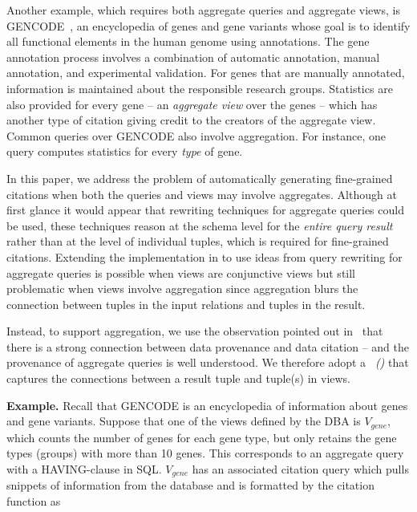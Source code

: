 Another example, which requires both aggregate queries and aggregate views, is GENCODE~\cite{harrow2012gencode}, an encyclopedia of genes and gene variants whose goal is to identify all functional elements in the human genome using annotations. The gene annotation process involves a combination of automatic annotation, manual annotation, and experimental validation. For genes that are manually annotated, information is maintained about the responsible research groups. Statistics are also provided for every gene -- an {\em aggregate view} over the genes -- which has another type of citation giving credit to the creators of the aggregate view.
Common queries over GENCODE also involve aggregation. For instance, one query computes statistics for every \textit{type} of gene.

In this paper, we address the problem of automatically generating fine-grained citations when both the queries and views may involve aggregates.    Although at first glance it would appear that rewriting techniques for aggregate queries \cite{zaharioudakis2000answering, srivastava1996answering, galindo2001orthogonal,cohen2006rewriting,cohen2006user} could be used, these techniques reason at the schema level for the \textit{entire query result} rather than at the level of individual tuples, which is required for fine-grained citations.  
Extending the implementation in \cite{wu2018data} to use ideas from query rewriting for aggregate queries is possible when views are conjunctive views but still problematic when views involve aggregation since aggregation blurs the connection between tuples in the input relations and tuples in the result.  

Instead, to support aggregation, we use the observation pointed out in~\cite{BunemanEtAl2016,alawini2018data} that there is a strong connection between data provenance and data citation -- and the provenance of aggregate queries is well understood.
We therefore adopt a \textit{\pbafull\ (\pba)} that captures the connections between a result tuple and tuple(s) in views.

\textbf{Example.}  Recall that GENCODE is an encyclopedia of information about genes and gene variants.  Suppose that one of the views defined by the DBA  is $V_{gene}$, which counts the number of genes for each gene type, but only retains the gene types (groups) with more than 10 genes.  This corresponds to an aggregate query with a HA\-VING-clause in SQL.  $V_{gene}$ has an associated citation query which pulls snippets of information from the database and is formatted by the citation function as 

